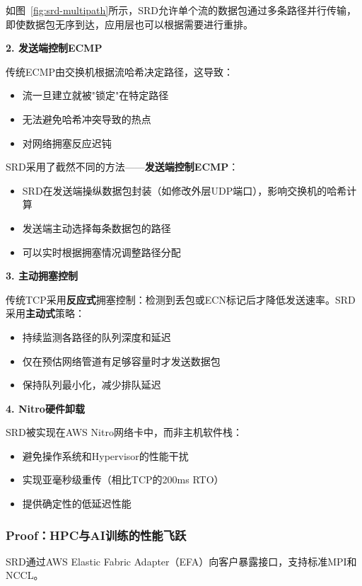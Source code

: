 如图~\ref{fig:srd-multipath}所示，SRD允许单个流的数据包通过多条路径并行传输，即使数据包无序到达，应用层也可以根据需要进行重排。

\textbf{2. 发送端控制ECMP}

传统ECMP由交换机根据流哈希决定路径，这导致：
\begin{itemize}
    \item 流一旦建立就被"锁定"在特定路径
    \item 无法避免哈希冲突导致的热点
    \item 对网络拥塞反应迟钝
\end{itemize}

SRD采用了截然不同的方法——\textbf{发送端控制ECMP}：
\begin{itemize}
    \item SRD在发送端操纵数据包封装（如修改外层UDP端口），影响交换机的哈希计算
    \item 发送端主动选择每条数据包的路径
    \item 可以实时根据拥塞情况调整路径分配
\end{itemize}

\textbf{3. 主动拥塞控制}

传统TCP采用\textbf{反应式}拥塞控制：检测到丢包或ECN标记后才降低发送速率。SRD采用\textbf{主动式}策略：

\begin{itemize}
    \item 持续监测各路径的队列深度和延迟
    \item 仅在预估网络管道有足够容量时才发送数据包
    \item 保持队列最小化，减少排队延迟
\end{itemize}

\textbf{4. Nitro硬件卸载}

SRD被实现在AWS Nitro网络卡中，而非主机软件栈：
\begin{itemize}
    \item 避免操作系统和Hypervisor的性能干扰
    \item 实现亚毫秒级重传（相比TCP的200ms RTO）
    \item 提供确定性的低延迟性能
\end{itemize}

\subsubsection{Proof：HPC与AI训练的性能飞跃}

SRD通过AWS Elastic Fabric Adapter（EFA）向客户暴露接口，支持标准MPI和NCCL。

